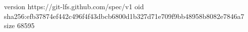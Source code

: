 version https://git-lfs.github.com/spec/v1
oid sha256:efb37874ef442c496f4f43dbcb6800d1b327d71e709f9bb48958b8082e7846a7
size 68595
